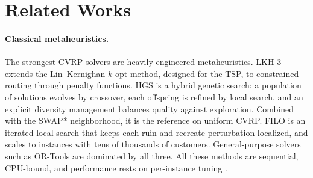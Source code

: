 \documentclass[letterpaper]{article} %
\begin{document}
\section{Related Works}


\paragraph{Classical metaheuristics.}
The strongest CVRP solvers are heavily engineered metaheuristics. LKH-3
\citep{helsgaun_extension_2017} extends the Lin--Kernighan $k$-opt method,
designed for the TSP, to constrained routing through penalty functions. HGS
\citep{vidal_hybrid_2022} is a hybrid genetic search: a population of
solutions evolves by crossover, each offspring is refined by local search,
and an explicit diversity management balances quality against exploration.
Combined with the SWAP* neighborhood, it is the reference on uniform CVRP.
FILO \citep{accorsi_fast_2021} is an iterated local search that keeps each
ruin-and-recreate perturbation localized, and scales to instances with tens
of thousands of customers. General-purpose solvers such as OR-Tools
\citep{ortools_routing} are dominated by all three. All these methods are sequential, CPU-bound, and performance rests on per-instance tuning \citep{liu_heuristics_2023}.


\end{document}
